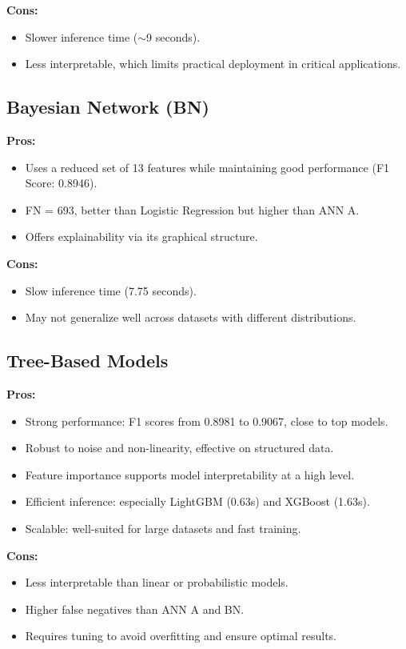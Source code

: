 \documentclass[conference]{IEEEtran}
\begin{document}
\textbf{Cons:}
\begin{itemize}
  \item Slower inference time ($\sim$9 seconds).
  \item Less interpretable, which limits practical deployment in critical applications.
\end{itemize}

\subsection*{Bayesian Network (BN)}

\textbf{Pros:}
\begin{itemize}
  \item Uses a reduced set of 13 features while maintaining good performance (F1 Score: 0.8946).
  \item FN = 693, better than Logistic Regression but higher than ANN A.
  \item Offers explainability via its graphical structure.
\end{itemize}

\textbf{Cons:}
\begin{itemize}
  \item Slow inference time (7.75 seconds).
  \item May not generalize well across datasets with different distributions.
\end{itemize}

\subsection*{Tree-Based Models}

\textbf{Pros:}
\begin{itemize}
  \item Strong performance: F1 scores from 0.8981 to 0.9067, close to top models.
  \item Robust to noise and non-linearity, effective on structured data.
  \item Feature importance supports model interpretability at a high level.
  \item Efficient inference: especially LightGBM (0.63s) and XGBoost (1.63s).
  \item Scalable: well-suited for large datasets and fast training.
\end{itemize}

\textbf{Cons:}
\begin{itemize}
  \item Less interpretable than linear or probabilistic models.
  \item Higher false negatives than ANN A and BN.
  \item Requires tuning to avoid overfitting and ensure optimal results.
\end{itemize}
\end{document}
